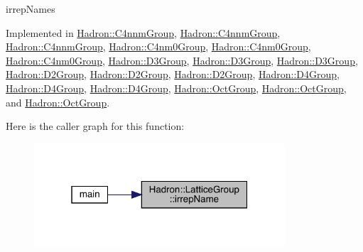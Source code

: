 irrep\+Names 

Implemented in \mbox{\hyperlink{structHadron_1_1C4nnmGroup_ac2b3ee6989ddbd93bc63c46ac9626997}{Hadron\+::\+C4nnm\+Group}}, \mbox{\hyperlink{structHadron_1_1C4nnmGroup_ac2b3ee6989ddbd93bc63c46ac9626997}{Hadron\+::\+C4nnm\+Group}}, \mbox{\hyperlink{structHadron_1_1C4nnmGroup_ac2b3ee6989ddbd93bc63c46ac9626997}{Hadron\+::\+C4nnm\+Group}}, \mbox{\hyperlink{structHadron_1_1C4nm0Group_ae7e7c420d17cacaed69a74902af72dcc}{Hadron\+::\+C4nm0\+Group}}, \mbox{\hyperlink{structHadron_1_1C4nm0Group_ae7e7c420d17cacaed69a74902af72dcc}{Hadron\+::\+C4nm0\+Group}}, \mbox{\hyperlink{structHadron_1_1C4nm0Group_ae7e7c420d17cacaed69a74902af72dcc}{Hadron\+::\+C4nm0\+Group}}, \mbox{\hyperlink{structHadron_1_1D3Group_a3e60ca3001ddc0176179107cfed2d621}{Hadron\+::\+D3\+Group}}, \mbox{\hyperlink{structHadron_1_1D3Group_a3e60ca3001ddc0176179107cfed2d621}{Hadron\+::\+D3\+Group}}, \mbox{\hyperlink{structHadron_1_1D3Group_a3e60ca3001ddc0176179107cfed2d621}{Hadron\+::\+D3\+Group}}, \mbox{\hyperlink{structHadron_1_1D2Group_a502111e32a238c50b248b9f7b0625385}{Hadron\+::\+D2\+Group}}, \mbox{\hyperlink{structHadron_1_1D2Group_a502111e32a238c50b248b9f7b0625385}{Hadron\+::\+D2\+Group}}, \mbox{\hyperlink{structHadron_1_1D2Group_a502111e32a238c50b248b9f7b0625385}{Hadron\+::\+D2\+Group}}, \mbox{\hyperlink{structHadron_1_1D4Group_a5f121bd08a7add3ddf660c7e3478cb9e}{Hadron\+::\+D4\+Group}}, \mbox{\hyperlink{structHadron_1_1D4Group_a5f121bd08a7add3ddf660c7e3478cb9e}{Hadron\+::\+D4\+Group}}, \mbox{\hyperlink{structHadron_1_1D4Group_a5f121bd08a7add3ddf660c7e3478cb9e}{Hadron\+::\+D4\+Group}}, \mbox{\hyperlink{structHadron_1_1OctGroup_a58f84ff32d1dce2277f3b9da9d35d594}{Hadron\+::\+Oct\+Group}}, \mbox{\hyperlink{structHadron_1_1OctGroup_a58f84ff32d1dce2277f3b9da9d35d594}{Hadron\+::\+Oct\+Group}}, and \mbox{\hyperlink{structHadron_1_1OctGroup_a58f84ff32d1dce2277f3b9da9d35d594}{Hadron\+::\+Oct\+Group}}.

Here is the caller graph for this function\+:
\nopagebreak
\begin{figure}[H]
\begin{center}
\leavevmode
\includegraphics[width=265pt]{dd/d2e/structHadron_1_1LatticeGroup_a4bc5620218c2a73157e19bc4451fe746_icgraph}
\end{center}
\end{figure}
\mbox{\label{structHadron_1_1LatticeGroup_a4bc5620218c2a73157e19bc4451fe746}} 
